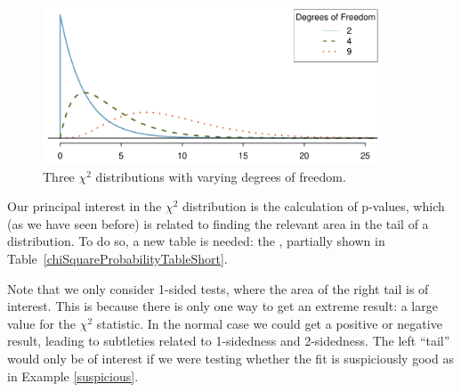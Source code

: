 \begin{figure}%
\centering
\includegraphics[width=0.9\textwidth]{ch_inference_for_props/figures/chiSquareDistributionWithInceasingDF/chiSquareDistributionWithInceasingDF}
\caption{Three $\chi^2$ distributions with varying degrees of freedom.}
\label{chiSquareDistributionWithInceasingDF}
\end{figure}


Our principal interest in the $\chi^2$ distribution is the calculation of p-values, which (as we have seen before) is related to finding the relevant area in the tail of a distribution. To do so, a new table is needed: the , partially shown in Table~\ref{chiSquareProbabilityTableShort}.

Note that we only consider 1-sided tests, where the area of the right tail is of interest. This is because there is only one way to get an extreme result: a large value for the $\chi^2$ statistic. In the normal case we could get a positive or negative result, leading to subtleties related to 1-sidedness and 2-sidedness. The left ``tail'' would only be of interest if we were testing whether the fit is suspiciously good as in Example \ref{suspicious}.

